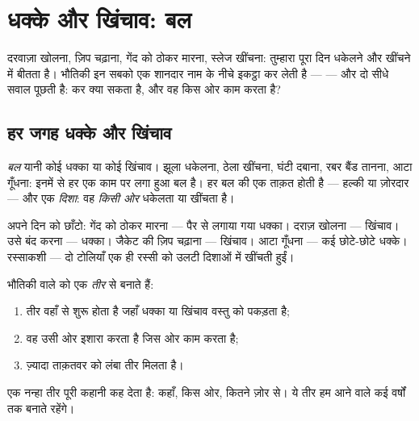 \chapter{धक्के और खिंचाव: बल}\label{ch:g2:pushes-and-pulls}

दरवाज़ा खोलना, ज़िप चढ़ाना, गेंद को ठोकर मारना, स्लेज खींचना: तुम्हारा
पूरा दिन धकेलने और खींचने में बीतता है। भौतिकी इन सबको एक शानदार नाम
के नीचे इकट्ठा कर लेती है --- \emph{} --- और दो सीधे सवाल पूछती
है:  कर क्या सकता है, और वह किस ओर काम करता है?

\section{हर जगह धक्के और खिंचाव}

\begin{definition}[बल]\label{def:g2:pushes-and-pulls:force}
\emph{बल} यानी कोई धक्का या कोई खिंचाव। झूला धकेलना, ठेला
खींचना, घंटी दबाना, रबर बैंड तानना, आटा गूँधना: इनमें से हर एक काम
पर लगा हुआ बल है। हर बल की एक ताक़त होती है --- हल्की या ज़ोरदार ---
और एक \emph{दिशा}: वह \emph{किसी ओर} धकेलता या खींचता है।
\end{definition}

\begin{example}[धक्का या खिंचाव?]\label{ex:g2:pushes-and-pulls:sort}
अपने दिन को छाँटो: गेंद को ठोकर मारना --- पैर से लगाया गया धक्का।
दराज़ खोलना --- खिंचाव। उसे बंद करना --- धक्का। जैकेट की ज़िप चढ़ाना
--- खिंचाव। आटा गूँधना --- कई छोटे-छोटे धक्के। रस्साकशी --- दो टोलियाँ
एक ही रस्सी को उलटी दिशाओं में खींचती हुईं।
\end{example}

\begin{method}[बल को तीर से बनाना]\label{met:g2:pushes-and-pulls:arrow}
भौतिकी वाले  को एक \emph{तीर} से बनाते हैं:
\begin{enumerate}
  \item तीर वहाँ से शुरू होता है जहाँ धक्का या खिंचाव वस्तु को पकड़ता
        है;
  \item वह उसी ओर इशारा करता है जिस ओर  काम करता है;
  \item ज़्यादा ताक़तवर  को लंबा तीर मिलता है।
\end{enumerate}
एक नन्हा तीर पूरी कहानी कह देता है: कहाँ, किस ओर, कितने ज़ोर से। ये
तीर हम आने वाले कई वर्षों तक बनाते रहेंगे।
\end{method}

